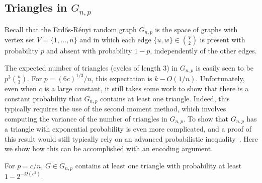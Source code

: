 \documentclass{patmorin}
\begin{document}
\subsection{Triangles in $G_{n,p}$}

Recall that the Erd\H{o}s-R\'{e}nyi random graph $G_{n,p}$ is the
space of graphs with vertex set $V=\{1,\ldots,n\}$ and in which each
edge $\{u, w\} \in \binom{V}{2}$ is present with probability $p$ and
absent with probability $1-p$, independently of the other edges.

The expected number of triangles (cycles of length 3) in $G_{n,p}$ is
easily seen to be $p^3\binom{n}{3}$.  For $p=(6c)^{1/3}/n$, this
expectation is $k-O(1/n)$.  Unfortunately, even when $c$ is a large
constant, it still takes some work to show that there is a constant
probability that $G_{n,p}$ contains at least one triangle. Indeed,
this typically requires the use of the second moment method, which
involves computing the variance of the number of triangles in
$G_{n,p}$. To show that $G_{n, p}$ has a triangle with exponential
probability is even more complicated, and a proof of this result would
still typically rely on an advanced probabilistic
inequality~\cite{alon:probabilistic}. Here we show how this can be
accomplished with an encoding argument.

\begin{thm}
  For $p=c/n$, $G \in G_{n,p}$ contains at least one triangle with
  probability at least $1-2^{-\Omega(c^3)}$.
\end{thm}
\end{document}

